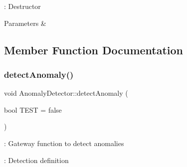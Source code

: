 \+: Destructor 


\begin{DoxyParams}{Parameters}
{\em } & \\
\hline
\end{DoxyParams}


\subsection{Member Function Documentation}
\mbox{\label{class_anomaly_detector_ac053d1b920d7cd4608bc3de291a7aeb0}} 
\subsubsection{\texorpdfstring{detect\+Anomaly()}{detectAnomaly()}}
{\footnotesize\ttfamily void Anomaly\+Detector\+::detect\+Anomaly (\begin{DoxyParamCaption}\item[{bool}]{T\+E\+ST = {\ttfamily false} }\end{DoxyParamCaption})}



\+: Gateway function to detect anomalies 

\+: Detection definition


